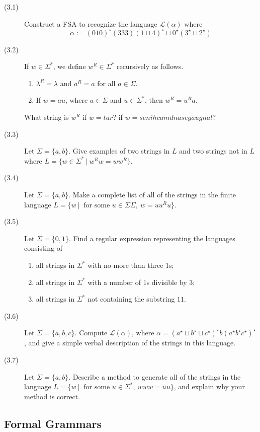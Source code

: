 \documentclass{article}
\newcommand{\El}{\mathcal L}
\begin{document}
\begin{description}
  \item[(3.1)] Construct a FSA to recognize the language $\El(\alpha)$ where
    \begin{equation*}
    \alpha := (010)^\star (333)(1 \sqcup 4)^\star \sqcup 0^\star (3^\star \sqcup 2^\star)
    \end{equation*}
  \item[(3.2)] If $w \in \Sigma^*$, we define $w^R \in \Sigma^*$ recursively as follows.
    \begin{enumerate}
      \item $\lambda^R = \lambda$ and $a^R = a$ for all $a \in \Sigma$.
      \item If $w = au$, where $a \in \Sigma$ and $u \in \Sigma^*$, then $w^R = u^R a$.
    \end{enumerate}
    What string is $w^R$ if $w = tar$? if $w = senihcamdnasegaugnal$?
  \item[(3.3)] Let $\Sigma = \{a,b\}$. Give examples of two strings in $L$ and two strings not in $L$ where $L = \{ w \in \Sigma^*\ |\ w^R w = w w^R \}$.
  \item[(3.4)] Let $\Sigma = \{a,b\}$. Make a complete list of all of the strings in the finite language $L = \{ w\ |\ \text{ for some } u \in \Sigma \Sigma,\ w = u u^R u \}$.
  \item[(3.5)] Let $\Sigma = \{0,1\}$. Find a regular expression representing the languages consisting of
    \begin{enumerate}
      \item all strings in $\Sigma^*$ with no more than three $1$s;
      \item all strings in $\Sigma^*$ with a number of $1$s divisible by $3$;
      \item all strings in $\Sigma^*$ not containing the substring $11$.
    \end{enumerate}
  \item[(3.6)] Let $\Sigma = \{a,b,c\}$. Compute $\El(\alpha)$, where $\alpha = ( a^\star \sqcup b^\star \sqcup c^\star )^\star b ( a^\star b^\star c^\star )^\star$, and give a simple verbal description of the strings in this language.
  \item[(3.7)] Let $\Sigma = \{a,b\}$. Describe a method to generate all of the strings in the language $L = \{ w\ |\ \text{ for some } u \in \Sigma^*,\ www = uu \}$, and explain why your method is correct.
\end{description}


\subsection{Formal Grammars} %
\end{document}
